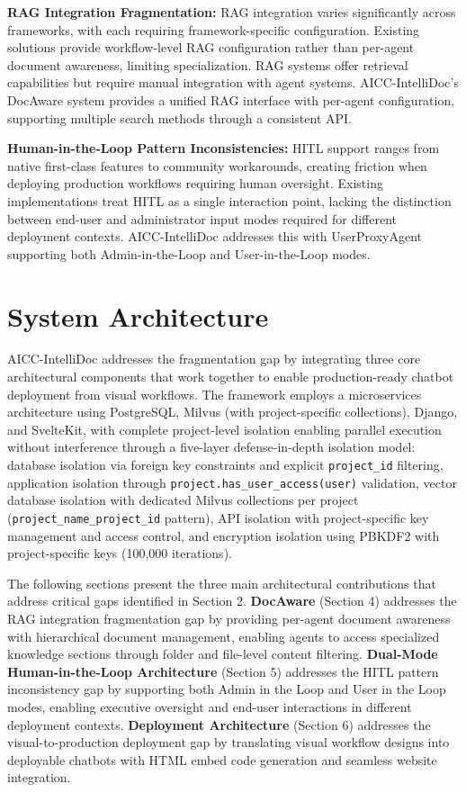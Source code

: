 \documentclass[11pt]{article}
\begin{document}
\textbf{RAG Integration Fragmentation:} RAG integration varies significantly across frameworks, with each requiring framework-specific configuration. Existing solutions provide workflow-level RAG configuration rather than per-agent document awareness, limiting specialization. RAG systems offer retrieval capabilities but require manual integration with agent systems. AICC-IntelliDoc's DocAware system provides a unified RAG interface with per-agent configuration, supporting multiple search methods through a consistent API.

\textbf{Human-in-the-Loop Pattern Inconsistencies:} HITL support ranges from native first-class features to community workarounds, creating friction when deploying production workflows requiring human oversight. Existing implementations treat HITL as a single interaction point, lacking the distinction between end-user and administrator input modes required for different deployment contexts. AICC-IntelliDoc addresses this with UserProxyAgent supporting both Admin-in-the-Loop and User-in-the-Loop modes.

\section{System Architecture}

AICC-IntelliDoc addresses the fragmentation gap by integrating three core architectural components that work together to enable production-ready chatbot deployment from visual workflows. The framework employs a microservices architecture using PostgreSQL, Milvus (with project-specific collections), Django, and SvelteKit, with complete project-level isolation enabling parallel execution without interference through a five-layer defense-in-depth isolation model: database isolation via foreign key constraints and explicit \texttt{project\_id} filtering, application isolation through \texttt{project.has\_user\_access(user)} validation, vector database isolation with dedicated Milvus collections per project (\texttt{project\_name\_project\_id} pattern), API isolation with project-specific key management and access control, and encryption isolation using PBKDF2 with project-specific keys (100,000 iterations).

The following sections present the three main architectural contributions that address critical gaps identified in Section 2. \textbf{DocAware} (Section 4) addresses the RAG integration fragmentation gap by providing per-agent document awareness with hierarchical document management, enabling agents to access specialized knowledge sections through folder and file-level content filtering. \textbf{Dual-Mode Human-in-the-Loop Architecture} (Section 5) addresses the HITL pattern inconsistency gap by supporting both Admin in the Loop and User in the Loop modes, enabling executive oversight and end-user interactions in different deployment contexts. \textbf{Deployment Architecture} (Section 6) addresses the visual-to-production deployment gap by translating visual workflow designs into deployable chatbots with HTML embed code generation and seamless website integration.
\end{document}
